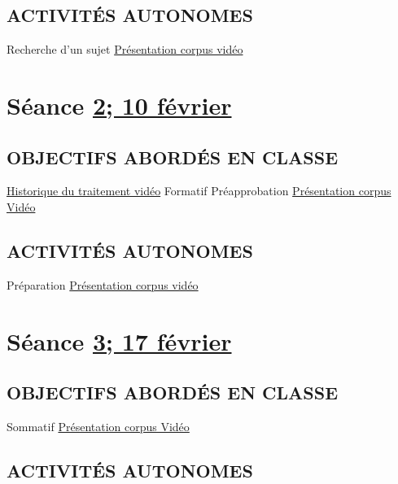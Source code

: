 \documentclass[
]{book}
\begin{document}
\hypertarget{activituxe9s-autonomes}{%
\subsection{ACTIVITÉS AUTONOMES}\label{activituxe9s-autonomes}}

Recherche d'un sujet \protect\hyperlink{sommatif_1}{Présentation corpus vidéo}

\hypertarget{semaine_2}{%
\section{\texorpdfstring{Séance \protect\hyperlink{semaine_2}{2; 10 février}}{Séance 2; 10 février}}\label{semaine_2}}

\hypertarget{objectifs-aborduxe9s-en-classe-1}{%
\subsection{OBJECTIFS ABORDÉS EN CLASSE}\label{objectifs-aborduxe9s-en-classe-1}}

\protect\hyperlink{evolution_historique}{Historique du traitement vidéo} Formatif Préapprobation \protect\hyperlink{sommatif_1}{Présentation corpus Vidéo}

\hypertarget{activituxe9s-autonomes-1}{%
\subsection{ACTIVITÉS AUTONOMES}\label{activituxe9s-autonomes-1}}

Préparation \protect\hyperlink{sommatif_1}{Présentation corpus vidéo}

\hypertarget{semaine_3}{%
\section{\texorpdfstring{Séance \protect\hyperlink{semaine_3}{3; 17 février}}{Séance 3; 17 février}}\label{semaine_3}}

\hypertarget{objectifs-aborduxe9s-en-classe-2}{%
\subsection{OBJECTIFS ABORDÉS EN CLASSE}\label{objectifs-aborduxe9s-en-classe-2}}

Sommatif \protect\hyperlink{sommatif_1}{Présentation corpus Vidéo}

\hypertarget{activituxe9s-autonomes-2}{%
\subsection{ACTIVITÉS AUTONOMES}\label{activituxe9s-autonomes-2}}
\end{document}
